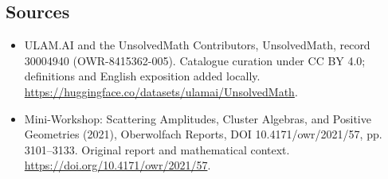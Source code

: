 \documentclass[11pt]{article}
\begin{document}
\subsection{Sources}
\begin{itemize}
\item[\hypertarget{source:30004940:1}{S1}] ULAM.AI and the UnsolvedMath Contributors, UnsolvedMath, record 30004940 (OWR-8415362-005). Catalogue curation under CC BY 4.0; definitions and English exposition added locally.
\url{https://huggingface.co/datasets/ulamai/UnsolvedMath}.
\item[\hypertarget{source:30004940:2}{S2}] Mini-Workshop: Scattering Amplitudes, Cluster Algebras, and Positive Geometries (2021), Oberwolfach Reports, DOI 10.4171/owr/2021/57, pp. 3101--3133. Original report and mathematical context.
\url{https://doi.org/10.4171/owr/2021/57}.
\end{itemize}
\label{end:30004940}
\end{document}

